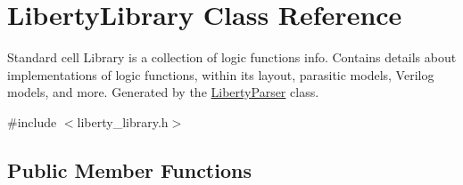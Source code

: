 \hypertarget{classLibertyLibrary}{\section{Liberty\-Library Class Reference}
\label{classLibertyLibrary}
}


Standard cell Library is a collection of logic functions info. Contains details about implementations of logic functions, within its layout, parasitic models, Verilog models, and more. Generated by the \hyperlink{classLibertyParser}{Liberty\-Parser} class.  




{\ttfamily \#include $<$liberty\-\_\-library.\-h$>$}

\subsection*{Public Member Functions}
